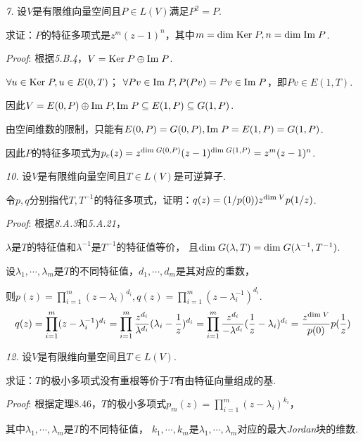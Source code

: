 \hspace*{\fill}

\textit{7.}
设$V$是有限维向量空间且$P \in L(V)$满足$P^2=P$.

求证：$P$的特征多项式是$z^m(z-1)^n$，其中$m=\mathrm{dim \;} \mathrm{Ker \;} P,n=\mathrm{dim \;} \mathrm{Im \;} P$.

\textit{Proof}:
根据\textit{5.B.4}，$V=\mathrm{Ker \;} P \oplus \mathrm{Im \;} P$.

$\forall u \in \mathrm{Ker \;} P,u \in E(0,T)$；
$\forall Pv \in \mathrm{Im \;} P,P(Pv)=Pv \in \mathrm{Im \;} P$，即$Pv \in E(1,T)$.

因此$V=E(0,P) \oplus \mathrm{Im \;} P,\mathrm{Im \;} P \subseteq E(1,P) \subseteq G(1,P)$.

由空间维数的限制，只能有$E(0,P)=G(0,P),\mathrm{Im \;} P=E(1,P)=G(1,P)$.

因此$P$的特征多项式为$p_c(z)=z^{\mathrm{dim \;} G(0,P)}(z-1)^{\mathrm{dim \;} G(1,P)}=z^m(z-1)^n$.

\newpage

\textit{10.}
设$V$是有限维向量空间且$T \in L(V)$是可逆算子.

令$p,q$分别指代$T,T^{-1}$的特征多项式，证明：$q(z)=(1/p(0))z^{\mathrm{dim \;} V}p(1/z)$.

\textit{Proof}:
根据\textit{8.A.3}和\textit{5.A.21}，

$\lambda$是$T$的特征值和$\lambda^{-1}$是$T^{-1}$的特征值等价，
且$\mathrm{dim \;} G(\lambda,T)=\mathrm{dim \;} G(\lambda^{-1},T^{-1})$.

设$\lambda_1,\cdots,\lambda_m$是$T$的不同特征值，$d_1,\cdots,d_m$是其对应的重数，

则$p(z)=\prod_{i=1}^m (z-\lambda_i)^{d_i},q(z)=\prod_{i=1}^m (z-\lambda_i^{-1})^{d_i}$.
    \begin{align*}
        q(z)=\prod_{i=1}^m (z-\lambda_i^{-1})^{d_i}
            =\prod_{i=1}^m \frac{z^{d_i}}{\lambda^{d_i}}(\lambda_i-\frac{1}{z})^{d_i}
            =\prod_{i=1}^m \frac{z^{d_i}}{-\lambda^{d_i}}(\frac{1}{z}-\lambda_i)^{d_i}
            =\frac{z^{\mathrm{dim \;} V}}{p(0)}p(\frac{1}{z})
    \end{align*}

\hspace*{\fill}

\textit{12.}
设$V$是有限维向量空间且$T \in L(V)$.

求证：$T$的极小多项式没有重根等价于$T$有由特征向量组成的基.

\textit{Proof}:
根据定理8.46，$T$的极小多项式$p_m(z)=\prod_{i=1}^m (z-\lambda_i)^{k_i}$，

其中$\lambda_1,\cdots,\lambda_m$是$T$的不同特征值，
$k_1,\cdots,k_m$是$\lambda_1,\cdots,\lambda_m$对应的最大\textit{Jordan}块的维数.

